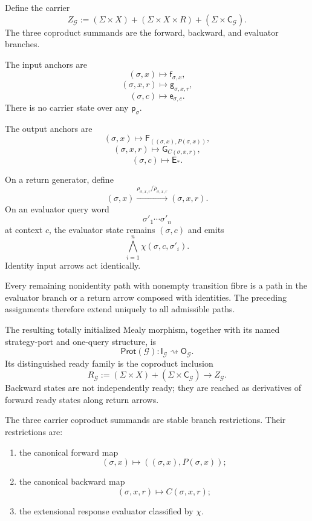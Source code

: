 Define the carrier
\[
  Z_{\mathcal G}
  :=
  (\Sigma\times X)
  +
  (\Sigma\times X\times R)
  +
  (\Sigma\times\mathsf C_{\mathcal G}).
\]
The three coproduct summands are the forward, backward, and evaluator branches.

The input anchors are
\[
  (\sigma,x)\longmapsto\mathsf f_{\sigma,x},
\]
\[
  (\sigma,x,r)\longmapsto\mathsf g_{\sigma,x,r},
\]
\[
  (\sigma,c)\longmapsto\mathsf e_{\sigma,c}.
\]
There is no carrier state over any \(\mathsf p_\sigma\).

The output anchors are
\[
  (\sigma,x)
  \longmapsto
  \mathsf F_{((\sigma,x),P(\sigma,x))},
\]
\[
  (\sigma,x,r)
  \longmapsto
  \mathsf G_{C(\sigma,x,r)},
\]
\[
  (\sigma,c)
  \longmapsto
  \mathsf E_*.
\]

On a return generator, define
\[
  (\sigma,x)
  \xrightarrow{
    \rho_{\sigma,x,r}/\bar\rho_{\sigma,x,r}
  }
  (\sigma,x,r).
\]
On an evaluator query word
\[
  \sigma'_1\cdots\sigma'_n
\]
at context \(c\), the evaluator state remains \((\sigma,c)\) and emits
\[
  \bigwedge_{i=1}^{n}
  \chi(\sigma,c,\sigma'_i).
\]
Identity input arrows act identically.

Every remaining nonidentity path with nonempty transition fibre is a path in the evaluator branch
or a return arrow composed with identities. The preceding assignments therefore extend uniquely to
all admissible paths.

\begin{definition}
\label{def:canonical-branch-faithful-protocol}
The resulting totally initialized Mealy morphism, together with its named strategy-port and
one-query structure, is
\[
  \mathsf{Prot}(\mathcal G):
  \mathsf I_{\mathcal G}
  \rightsquigarrow
  \mathsf O_{\mathcal G}.
\]
Its distinguished ready family is the coproduct inclusion
\[
  R_{\mathcal G}
  :=
  (\Sigma\times X)
  +
  (\Sigma\times\mathsf C_{\mathcal G})
  \longrightarrow
  Z_{\mathcal G}.
\]
Backward states are not independently ready; they are reached as derivatives of forward ready states
along return arrows.
\end{definition}

\begin{proposition}
\label{prop:canonical-branch-identification}
The three carrier coproduct summands are stable branch restrictions. Their restrictions are:
\begin{enumerate}
  \item the canonical forward map
  \[
    (\sigma,x)
    \longmapsto
    ((\sigma,x),P(\sigma,x));
  \]
  \item the canonical backward map
  \[
    (\sigma,x,r)
    \longmapsto
    C(\sigma,x,r);
  \]
  \item the extensional response evaluator classified by \(\chi\).
\end{enumerate}
\end{proposition}

